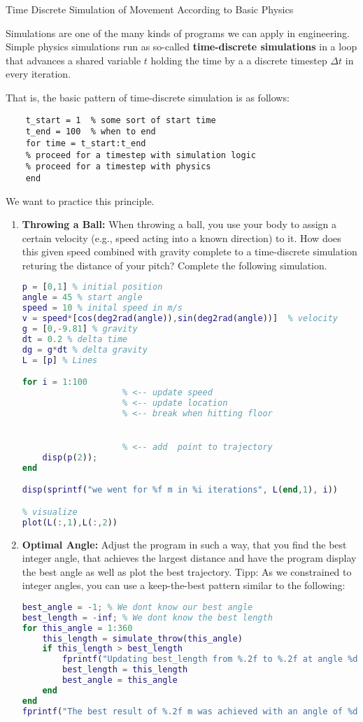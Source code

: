 \begin{task}{Time Discrete Simulation of Movement According to Basic Physics\up*}{}{}

  Simulations are one of the many kinds of programs we can apply in engineering.
  Simple physics simulations run as so-called \textbf{time-discrete simulations} in a loop that advances a
  shared variable $t$  holding the time by a a discrete timestep $\Delta t$ in every iteration.

  That is, the basic pattern of time-discrete simulation is as follows:
  \begin{lstlisting}
    t_start = 1  % some sort of start time
    t_end = 100  % when to end
    for time = t_start:t_end
    % proceed for a timestep with simulation logic
    % proceed for a timestep with physics
    end
  \end{lstlisting}
  We want to practice this principle.

  \begin{enumerate}
  \item{\textbf{Throwing a Ball:} When throwing a ball, you use your body to assign a certain velocity (e.g., speed acting into a known direction) to it. How does this given speed combined with gravity complete to a time-discrete simulation returing the distance of your pitch? Complete the following simulation.
    \begin{lstlisting}[language=Matlab]
p = [0,1] % initial position
angle = 45 % start angle
speed = 10 % inital speed in m/s
v = speed*[cos(deg2rad(angle)),sin(deg2rad(angle))]  % velocity
g = [0,-9.81] % gravity
dt = 0.2 % delta time
dg = g*dt % delta gravity
L = [p] % Lines

for i = 1:100
                    % <-- update speed
                    % <-- update location
                    % <-- break when hitting floor


                    % <-- add  point to trajectory
    disp(p(2));
end

disp(sprintf("we went for %f m in %i iterations", L(end,1), i))

% visualize
plot(L(:,1),L(:,2))

      \end{lstlisting}

    
  }
  \item{\textbf{Optimal Angle:} Adjust the program in such a way, that you find the best integer angle, that achieves the largest distance and have the program display the best angle as well as plot the best trajectory. Tipp: As we constrained to integer angles, you can use a keep-the-best pattern similar to the following:
    \begin{lstlisting}[language=Matlab]
best_angle = -1; % We dont know our best angle
best_length = -inf; % We dont know the best length
for this_angle = 1:360
    this_length = simulate_throw(this_angle)
    if this_length > best_length
        fprintf("Updating best_length from %.2f to %.2f at angle %d\n", best_length, this_length, this_angle)
        best_length = this_length
        best_angle = this_angle
    end
end
fprintf("The best result of %.2f m was achieved with an angle of %d\n",best_length, best_angle)


\end{lstlisting}}
\end{enumerate}
\end{task}
